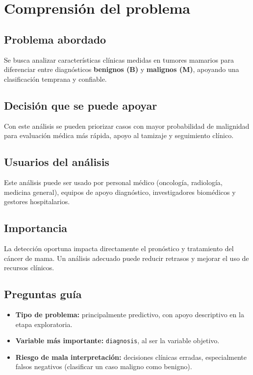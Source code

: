 \documentclass[12pt]{article}
\begin{document}
\section{Comprensión del problema}

\subsection{Problema abordado}
Se busca analizar características clínicas medidas en tumores mamarios para diferenciar entre diagnósticos \textbf{benignos (B)} y \textbf{malignos (M)}, apoyando una clasificación temprana y confiable.

\subsection{Decisión que se puede apoyar}
Con este análisis se pueden priorizar casos con mayor probabilidad de malignidad para evaluación médica más rápida, apoyo al tamizaje y seguimiento clínico.

\subsection{Usuarios del análisis}
Este análisis puede ser usado por personal médico (oncología, radiología, medicina general), equipos de apoyo diagnóstico, investigadores biomédicos y gestores hospitalarios.

\subsection{Importancia}
La detección oportuna impacta directamente el pronóstico y tratamiento del cáncer de mama. Un análisis adecuado puede reducir retrasos y mejorar el uso de recursos clínicos.

\subsection{Preguntas guía}
\begin{itemize}
    \item \textbf{Tipo de problema:} principalmente predictivo, con apoyo descriptivo en la etapa exploratoria.
    \item \textbf{Variable más importante:} \texttt{diagnosis}, al ser la variable objetivo.
    \item \textbf{Riesgo de mala interpretación:} decisiones clínicas erradas, especialmente falsos negativos (clasificar un caso maligno como benigno).
\end{itemize}
\end{document}
